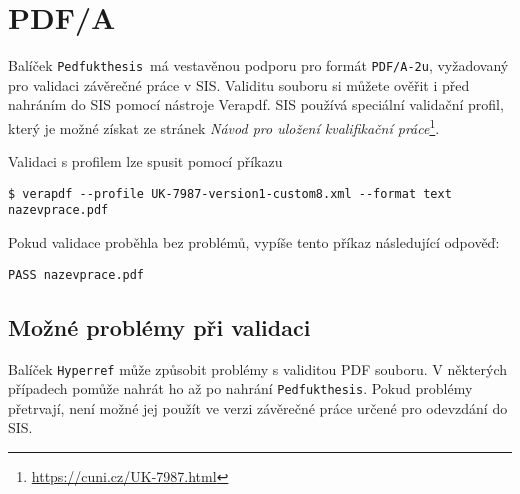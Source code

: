 \documentclass{ltxdoc}
\newcommand\pkgname{\texttt{Pedfukthesis}}
\begin{document}
\section{PDF/A}
Balíček \pkgname\ má vestavěnou podporu pro formát \texttt{PDF/A-2u},
vyžadovaný pro validaci závěrečné práce v SIS. Validitu souboru si můžete
ověřit i před nahráním do SIS pomocí nástroje
Verapdf. SIS používá speciální validační
profil, který je možné získat ze stránek
\textit{Návod pro uložení kvalifikační práce}\footnote{\url{https://cuni.cz/UK-7987.html}}.

Validaci s profilem lze spusit pomocí příkazu

\begin{verbatim}
$ verapdf --profile UK-7987-version1-custom8.xml --format text nazevprace.pdf
\end{verbatim}

Pokud validace proběhla bez problémů, vypíše tento příkaz následující odpověď:

\begin{verbatim}
PASS nazevprace.pdf
\end{verbatim}

\subsection{Možné problémy při validaci}

Balíček \texttt{Hyperref} může způsobit problémy s validitou PDF souboru. V některých případech
pomůže nahrát ho až po nahrání \pkgname. Pokud problémy přetrvají, není možné
jej použít ve verzi závěrečné práce určené pro odevzdání do SIS.
\end{document}
